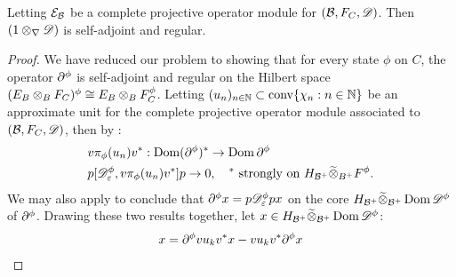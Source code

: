 \begin{theorem}\label{mesrennie318}
	Letting $\mathcal{E}_{\mathcal{B}}$ be a complete projective operator module for $(\mathcal{B},F_C,\mathscr{D})$. Then $(1\otimes_\nabla \mathscr{D})$ is self-adjoint and regular. 
\end{theorem}
\begin{proof}
	We have reduced our problem to showing that for every state $\phi$ on $C$, the operator $\part^\phi$ is self-adjoint and regular on the Hilbert space $(E_B\tens_B F_C)^\phi\cong E_B\tens_B F_C^\phi$. Letting $(u_n)_{n\in \mathbb{N}}\subset \operatorname{conv}\{\chi_n: n\in \mathbb{N} \}$ be an approximate unit for the complete projective operator module associated to $(\mathcal{B},F_C,\mathscr{D})$, then by : 
	\begin{align*}
		&v\pi_\phi(u_n)v^*:\dom(\part^\phi)^*\to \dom \part^\phi \\
		&p[\D^\phi_\epsilon,v\pi_\phi(u_n)v^*]p\to 0,\quad ^*\text{ strongly on }H_{\B^+}\optens_{B^+}F^\phi. 
	\end{align*}
	We may also apply  to conclude that $\part^\phi x=p\D^\phi_\epsilon px$ on the core $H_{\B^+}\optens_{\B^+} \dom \D^\phi$ of $\part^\phi$. Drawing these two results together, let $x\in H_{\B^+}\optens_{\B^+} \dom \D^\phi$:
	\begin{align*}
		[\part^\phi,vu_kv^*]x &=\part^\phi vu_kv^*x-vu_kv^*\part^\phi x \\

\end{align*}
\end{proof}
